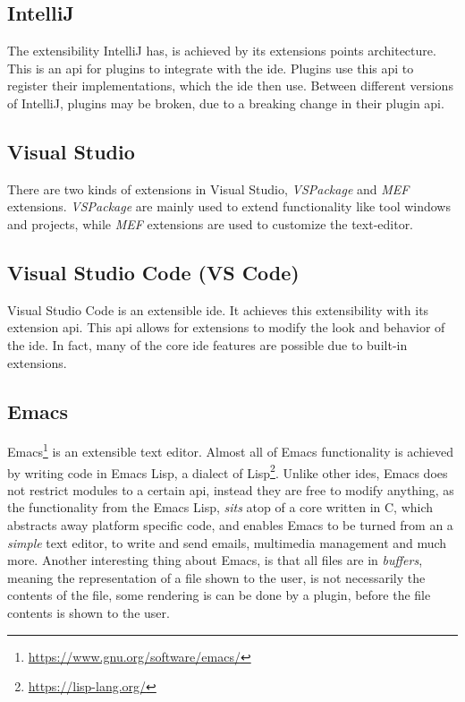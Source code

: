 \subsection{IntelliJ}

The extensibility IntelliJ has, is achieved by its extensions points
architecture. This is an \gls*{api} for plugins to integrate with the
\gls*{ide}. Plugins use this \gls*{api} to register their implementations, which
the \gls*{ide} then use. Between different versions of IntelliJ, plugins may be
broken, due to a breaking change in their plugin \gls*{api}.


\subsection{Visual Studio}

There are two kinds of extensions in Visual Studio, \textit{VSPackage} and
\textit{MEF} extensions. \textit{VSPackage} are mainly used to extend
functionality like tool windows and projects, while \textit{MEF} extensions are
used to customize the text-editor.

\subsection{Visual Studio Code (VS Code)}

Visual Studio Code is an extensible \gls*{ide}. It achieves this extensibility
with its extension \gls*{api}. This \gls*{api} allows for extensions to modify
the look and behavior of the \gls*{ide}. In fact, many of the core \gls*{ide}
features are possible due to built-in extensions.

\subsection{Emacs}

Emacs\footnote{\url{https://www.gnu.org/software/emacs/}} is an extensible text
editor. Almost all of Emacs functionality is achieved by writing code in Emacs
Lisp, a dialect of Lisp\footnote{\url{https://lisp-lang.org/}}. Unlike other
\gls*{ide}s, Emacs does not restrict modules to a certain \gls*{api}, instead
they are free to modify anything, as the functionality from the Emacs Lisp,
\textit{sits} atop of a core written in C, which abstracts away platform
specific code, and enables Emacs to be turned from an a \textit{simple} text
editor, to write and send emails, multimedia management and much more. Another
interesting thing about Emacs, is that all files are in \textit{buffers},
meaning the representation of a file shown to the user, is not necessarily the
contents of the file, some rendering is can be done by a plugin, before the file
contents is shown to the user.


